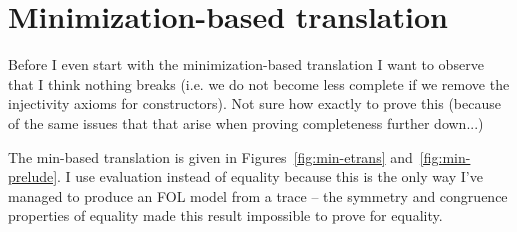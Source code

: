 \documentclass[preprint]{sigplanconf}
\begin{document}
\section{Minimization-based translation}

Before I even start with the minimization-based translation I want to
observe that I think nothing breaks (i.e. we do not become less
complete if we remove the injectivity axioms for constructors). Not
sure how exactly to prove this (because of the same issues that
that arise when proving completeness further down...)

The min-based translation is given in Figures~\ref{fig:min-etrans}
and~\ref{fig:min-prelude}. I use evaluation instead of equality
because this is the only way I've managed to produce an FOL model from
a trace -- the symmetry and congruence properties of equality made this
result impossible to prove for equality.
\end{document}
